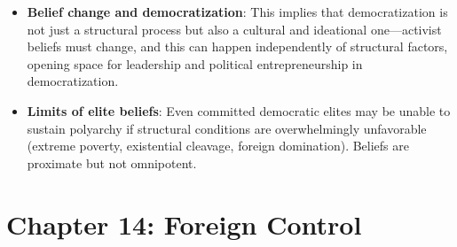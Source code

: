 \documentclass[12pt]{article}
\begin{document}
\begin{itemize}[leftmargin=*, itemsep=4pt]
\begin{itemize}
            \item \textbf{Socialization} in organizations and institutions that practice competitive norms.
            \item \textbf{Cross-national diffusion}: exposure to polyarchic models elsewhere.
            \item \textbf{Rational calculation}: elites who have experienced alternation of power may come to value the protections it offers them when they are in opposition.
        \end{itemize}
    \item \textbf{Belief change and democratization}: This implies that democratization is not just a structural process but also a cultural and ideational one---activist beliefs must change, and this can happen independently of structural factors, opening space for leadership and political entrepreneurship in democratization.
    \item \textbf{Limits of elite beliefs}: Even committed democratic elites may be unable to sustain polyarchy if structural conditions are overwhelmingly unfavorable (extreme poverty, existential cleavage, foreign domination). Beliefs are proximate but not omnipotent.
\end{itemize}

\section{Chapter 14: Foreign Control}
\end{document}
